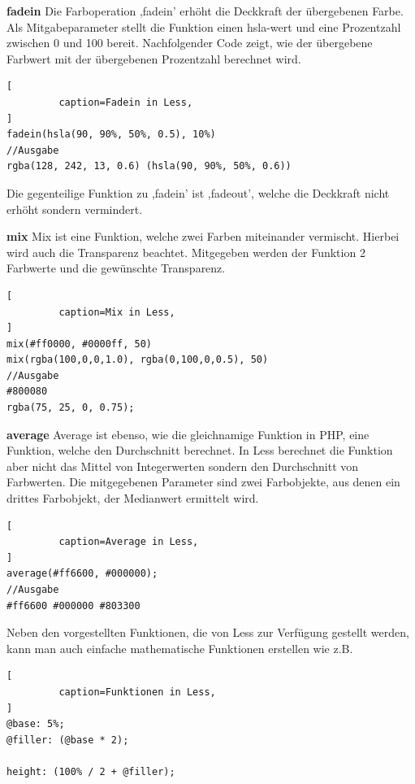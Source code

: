 \textbf{fadein}\newline
Die Farboperation ,fadein' erhöht die Deckkraft der übergebenen Farbe. Als Mitgabeparameter stellt die Funktion einen hsla-wert und eine Prozentzahl zwischen 0 und 100 bereit. Nachfolgender Code zeigt, wie der übergebene Farbwert mit der übergebenen Prozentzahl berechnet wird. \newpage
\begin{lstlisting}[
         caption=Fadein in Less,
]
fadein(hsla(90, 90%, 50%, 0.5), 10%)
//Ausgabe
rgba(128, 242, 13, 0.6) (hsla(90, 90%, 50%, 0.6))
\end{lstlisting}
Die gegenteilige Funktion zu ,fadein' ist ,fadeout', welche die Deckkraft nicht erhöht sondern vermindert.

\textbf{mix}\newline
Mix ist eine Funktion, welche zwei Farben miteinander vermischt. Hierbei wird auch die Transparenz beachtet. Mitgegeben werden der Funktion 2 Farbwerte und die gewünschte Transparenz.
\begin{lstlisting}[
         caption=Mix in Less,
]
mix(#ff0000, #0000ff, 50)
mix(rgba(100,0,0,1.0), rgba(0,100,0,0.5), 50)
//Ausgabe
#800080
rgba(75, 25, 0, 0.75);
\end{lstlisting}

\textbf{average}\newline
Average ist ebenso, wie die gleichnamige Funktion in PHP, eine Funktion, welche den Durchschnitt berechnet. In Less berechnet die Funktion aber nicht das Mittel von Integerwerten sondern den Durchschnitt von Farbwerten. Die mitgegebenen Parameter sind zwei Farbobjekte, aus denen ein drittes Farbobjekt, der Medianwert ermittelt wird.
\begin{lstlisting}[
         caption=Average in Less,
]
average(#ff6600, #000000);
//Ausgabe
#ff6600 #000000 #803300
\end{lstlisting}
\autocite[]{Sellier.2013}

Neben den vorgestellten Funktionen, die von Less zur Verfügung gestellt werden, kann man auch einfache mathematische Funktionen erstellen wie z.B.
\begin{lstlisting}[
         caption=Funktionen in Less,
]
@base: 5%;
@filler: (@base * 2);

height: (100% / 2 + @filler);
\end{lstlisting}
\newpage
